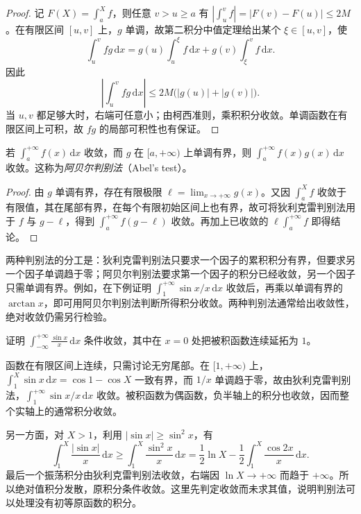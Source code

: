 \documentclass[UTF8,12pt,a4paper,fontset=fandol]{ctexbook}
\begin{document}
\begin{proof}
记 $F(X)=\int_a^X f$，则任意 $v>u\geq a$ 有 $|\int_u^v f|=|F(v)-F(u)|\leq2M$。在有限区间 $[u,v]$ 上，$g$ 单调，故第二积分中值定理给出某个 $\xi\in[u,v]$，使
\[
    \int_u^v fg\,\mathrm{d}x
    =g(u)\int_u^\xi f\,\mathrm{d}x
     +g(v)\int_\xi^v f\,\mathrm{d}x.
\]
因此
\[
    \left|\int_u^v fg\,\mathrm{d}x\right|
    \leq2M\bigl(|g(u)|+|g(v)|\bigr).
\]
当 $u,v$ 都足够大时，右端可任意小；由柯西准则，乘积积分收敛。单调函数在有限区间上可积，故 $fg$ 的局部可积性也有保证。
\end{proof}

\begin{theorem}[阿贝尔判别法]
\label{thm:abel-test-infinite-integrals}
若 $\int_a^{+\infty}f(x)\,\mathrm{d}x$ 收敛，而 $g$ 在 $[a,+\infty)$ 上单调有界，则 $\int_a^{+\infty}f(x)g(x)\,\mathrm{d}x$ 收敛。这称为\emph{阿贝尔判别法}（Abel's test）。
\end{theorem}

\begin{proof}
由 $g$ 单调有界，存在有限极限 $\ell=\lim_{x\to+\infty}g(x)$。又因 $\int_a^Xf$ 收敛于有限值，其在尾部有界，在每个有限初始区间上也有界，故可将狄利克雷判别法用于 $f$ 与 $g-\ell$，得到 $\int_a^{+\infty}f(g-\ell)$ 收敛。再加上已收敛的 $\ell\int_a^{+\infty}f$ 即得结论。
\end{proof}

两种判别法的分工是：狄利克雷判别法只要求一个因子的累积积分有界，但要求另一个因子单调趋于零；阿贝尔判别法要求第一个因子的积分已经收敛，另一个因子只需单调有界。例如，在下例证明 $\int_1^{+\infty}\sin x/x\,\mathrm{d}x$ 收敛后，再乘以单调有界的 $\arctan x$，即可用阿贝尔判别法判断所得积分收敛。两种判别法通常给出收敛性，绝对收敛仍需另行检验。

\begin{example}
\label{ex:sinc-integral-conditional-convergence}
证明 $\int_{-\infty}^{+\infty}\frac{\sin x}{x}\,\mathrm{d}x$ 条件收敛，其中在 $x=0$ 处把被积函数连续延拓为 $1$。
\end{example}

\begin{solve}
函数在有限区间上连续，只需讨论无穷尾部。在 $[1,+\infty)$ 上，$\int_1^X\sin x\,\mathrm{d}x=\cos1-\cos X$ 一致有界，而 $1/x$ 单调趋于零，故由狄利克雷判别法，$\int_1^{+\infty}\sin x/x\,\mathrm{d}x$ 收敛。被积函数为偶函数，负半轴上的积分也收敛，因而整个实轴上的通常积分收敛。

另一方面，对 $X>1$，利用 $|\sin x|\geq\sin^2x$，有
\[
    \int_1^X\frac{|\sin x|}{x}\,\mathrm{d}x
    \geq\int_1^X\frac{\sin^2x}{x}\,\mathrm{d}x
    =\frac12\ln X-\frac12\int_1^X\frac{\cos2x}{x}\,\mathrm{d}x.
\]
最后一个振荡积分由狄利克雷判别法收敛，右端因 $\ln X\to+\infty$ 而趋于 $+\infty$。所以绝对值积分发散，原积分条件收敛。这里先判定收敛而未求其值，说明判别法可以处理没有初等原函数的积分。
\end{solve}
\end{document}
